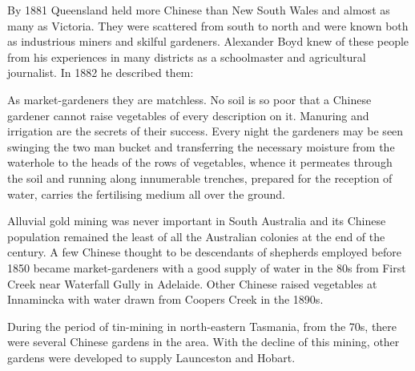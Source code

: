 By 1881 Queensland  held more Chinese
 than New South
Wales and almost as many as Victoria.  They were scattered from south
to north and were known both as industrious miners and skilful
gardeners.  Al\-exander Boyd  knew of these people
from his experiences in many districts as a schoolmaster and
agricultural journalist.  In 1882 he described
them:
\begin{Quote}
	As market-gardeners they are matchless.  No soil is so poor
	that a Chinese gardener cannot raise vegetables of every
	description on it.  Manuring and irrigation are the secrets of
	their success.  Every night the gardeners may be seen swinging
	the two man bucket and transferring the necessary moisture
	from the waterhole to the heads of the rows of vegetables,
	whence it permeates through the soil and running along
	innumerable trenches, prepared for the reception of water,
	carries the fertilising medium all over the
	ground.
\end{Quote}

Alluvial gold mining was never important in South Australia
 and its
Chinese  population remained the least of all the
Australian colonies at the end of the century.  A few Chinese thought
to be descendants of shepherds employed before 1850 became
market-gardeners with a good supply of water in the 80s from First
Creek  near Waterfall Gully  in Adelaide.  Other Chinese raised vegetables
at Innamincka  with water drawn from Coopers
Creek
 in the 1890s.

During the period of tin-mining in north-eastern Tasmania,
  from the
70s, there were several Chinese  gardens in the area.
With the decline of this mining, other gardens were developed to
supply Launceston
 and
Hobart.

